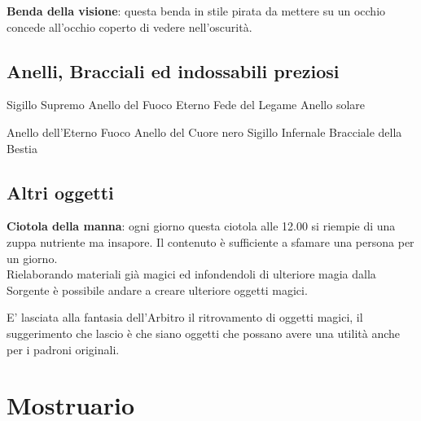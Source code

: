 \documentclass[12pt,a4paper,twoside,openany]{book}
\begin{document}
\begin{multicols}{2}
\textbf{Benda della visione}: questa benda in stile pirata da mettere su un occhio concede all'occhio coperto di vedere nell'oscurità.

\subsection{Anelli, Bracciali ed indossabili preziosi}
Sigillo Supremo
Anello del Fuoco Eterno
Fede del Legame
Anello solare

Anello dell'Eterno Fuoco
Anello del Cuore nero
Sigillo Infernale
Bracciale della Bestia

\subsection{Altri oggetti}

\textbf{Ciotola della manna}: ogni giorno questa ciotola alle 12.00 si riempie di una zuppa nutriente ma insapore. Il contenuto è sufficiente a sfamare una persona per un giorno.\\

Rielaborando materiali già magici ed infondendoli di ulteriore magia dalla Sorgente è possibile andare a creare ulteriore oggetti magici.

E' lasciata alla fantasia dell'Arbitro il ritrovamento di oggetti magici, il suggerimento che lascio è che siano oggetti che possano avere una utilità anche per i padroni originali.


\end{multicols}

\pagebreak

\section{Mostruario}
\end{document}
